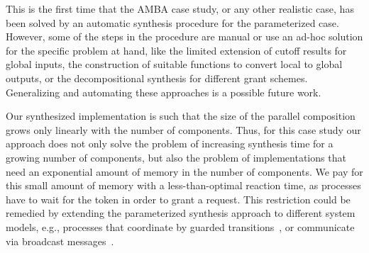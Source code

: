 This is the first time that the AMBA case study, or any other realistic case,
has been solved by an automatic synthesis 
procedure for the parameterized case. However, some of the steps in the 
procedure are manual or use an ad-hoc solution for the specific problem at 
hand, like the limited extension of cutoff results for global inputs, the 
construction of suitable functions to convert local to global outputs, or the 
decompositional synthesis for different grant schemes. Generalizing and 
automating these approaches is a possible future work.

Our synthesized implementation is such 
that the size of the parallel composition grows only linearly with the number of 
components. Thus, for this case study our approach does not only solve the 
problem of increasing synthesis time for a growing number of components, but 
also the problem of implementations that need an exponential amount of memory 
in the number of components. We pay for this small amount of memory with a 
less-than-optimal reaction time, as processes have to wait for the token in 
order to grant a request. This restriction could be remedied by extending the 
parameterized synthesis approach to different system models, e.g., processes 
that coordinate by guarded transitions~\cite{EmersonK03},
or communicate via broadcast messages~\cite{EsparzaFM99}.
